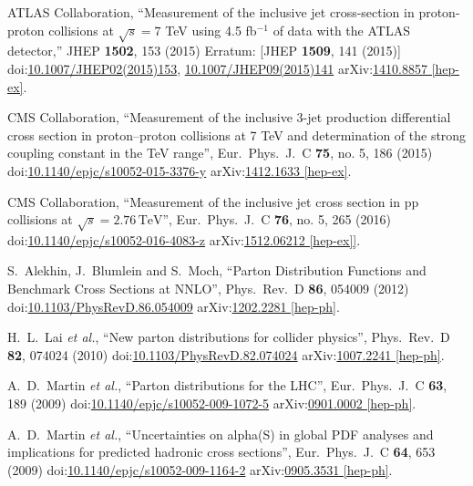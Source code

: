 \begin{thebibliography}{99}
ATLAS Collaboration, ``Measurement of the inclusive jet cross-section in proton-proton collisions at $ \sqrt{s}=7 $ TeV using 4.5 fb$^{-1}$ of data with the ATLAS detector,'' JHEP {\bf 1502}, 153 (2015) Erratum: [JHEP {\bf 1509}, 141 (2015)] doi:\href{http://dx.doi.org/10.1007/JHEP02(2015)153}{10.1007/JHEP02(2015)153}, \href{http://dx.doi.org/10.1007/JHEP09(2015)141}{10.1007/JHEP09(2015)141} arXiv:\href{https://arxiv.org/abs/1410.8857}{1410.8857 [hep-ex]}.

CMS Collaboration, ``Measurement of the inclusive 3-jet production differential cross section in proton–proton collisions at 7 TeV and determination of the strong coupling constant in the TeV range'', Eur.\ Phys.\ J.\ C {\bf 75}, no. 5, 186 (2015) doi:\href{http://dx.doi.org/10.1140/epjc/s10052-015-3376-y}{10.1140/epjc/s10052-015-3376-y} arXiv:\href{https://arxiv.org/abs/1412.1633}{1412.1633 [hep-ex]}.

CMS Collaboration, ``Measurement of the inclusive jet cross section in pp collisions at $\sqrt{s} = 2.76\,\text {TeV}$'', Eur.\ Phys.\ J.\ C {\bf 76}, no. 5, 265 (2016) doi:\href{http://dx.doi.org/10.1140/epjc/s10052-016-4083-z}{10.1140/epjc/s10052-016-4083-z} arXiv:\href{https://arxiv.org/abs/1512.06212}{1512.06212 [hep-ex]]}.

S.~Alekhin, J.~Blumlein and S.~Moch, ``Parton Distribution Functions and Benchmark Cross Sections at NNLO'', Phys.\ Rev.\ D {\bf 86}, 054009 (2012) doi:\href{http://dx.doi.org/10.1103/PhysRevD.86.054009}{10.1103/PhysRevD.86.054009} arXiv:\href{https://arxiv.org/abs/1202.2281}{1202.2281 [hep-ph]}.

  H.~L.~Lai {\it et al.}, ``New parton distributions for collider physics'', Phys.\ Rev.\ D {\bf 82}, 074024 (2010) doi:\href{http://dx.doi.org/10.1103/PhysRevD.82.074024}{10.1103/PhysRevD.82.074024} arXiv:\href{https://arxiv.org/abs/1007.2241}{1007.2241 [hep-ph]}.
  
A.~D.~Martin {\it et al.}, ``Parton distributions for the LHC'', Eur.\ Phys.\ J.\ C {\bf 63}, 189 (2009) doi:\href{http://dx.doi.org/10.1140/epjc/s10052-009-1072-5}{10.1140/epjc/s10052-009-1072-5} arXiv:\href{https://arxiv.org/abs/0901.0002}{0901.0002 [hep-ph]}.

  A.~D.~Martin {\it et al.}, ``Uncertainties on alpha(S) in global PDF analyses and implications for predicted hadronic cross sections'', Eur.\ Phys.\ J.\ C {\bf 64}, 653 (2009) doi:\href{http://dx.doi.org/10.1140/epjc/s10052-009-1164-2}{10.1140/epjc/s10052-009-1164-2} arXiv:\href{https://arxiv.org/abs/0905.3531}{0905.3531 [hep-ph]}.


\end{thebibliography}
